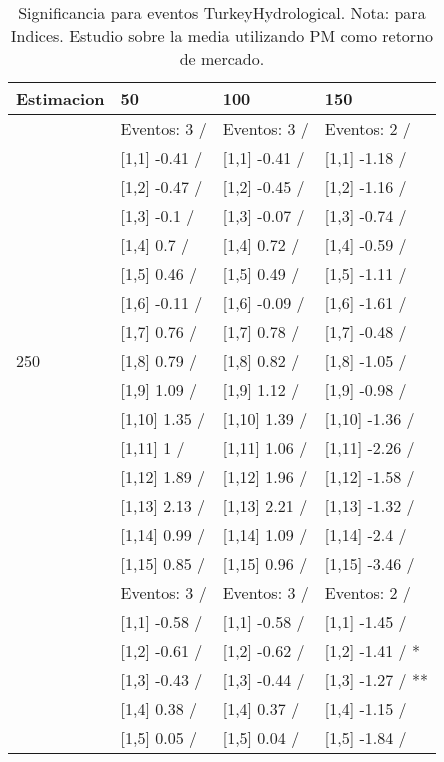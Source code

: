 \begin{table}

\caption{Significancia para eventos TurkeyHydrological. Nota: para Indices. Estudio sobre la media utilizando PM como retorno de mercado.}
\centering
\begin{tabular}[t]{llll}
\toprule
Estimacion & 50 & 100 & 150\\
\midrule
 & Eventos:  3 / & Eventos:  3 / & Eventos:  2 /\\
 & {}[1,1] -0.41  / & {}[1,1] -0.41  / & {}[1,1] -1.18  /\\
 & {}[1,2] -0.47  / & {}[1,2] -0.45  / & {}[1,2] -1.16  /\\
 & {}[1,3] -0.1  / & {}[1,3] -0.07  / & {}[1,3] -0.74  /\\
 & {}[1,4] 0.7  / & {}[1,4] 0.72  / & {}[1,4] -0.59  /\\
\addlinespace
 & {}[1,5] 0.46  / & {}[1,5] 0.49  / & {}[1,5] -1.11  /\\
 & {}[1,6] -0.11  / & {}[1,6] -0.09  / & {}[1,6] -1.61  /\\
 & {}[1,7] 0.76  / & {}[1,7] 0.78  / & {}[1,7] -0.48  /\\
250 & {}[1,8] 0.79  / & {}[1,8] 0.82  / & {}[1,8] -1.05  /\\
 & {}[1,9] 1.09  / & {}[1,9] 1.12  / & {}[1,9] -0.98  /\\
\addlinespace
 & {}[1,10] 1.35  / & {}[1,10] 1.39  / & {}[1,10] -1.36  /\\
 & {}[1,11] 1  / & {}[1,11] 1.06  / & {}[1,11] -2.26  /\\
 & {}[1,12] 1.89  / & {}[1,12] 1.96  / & {}[1,12] -1.58  /\\
 & {}[1,13] 2.13  / & {}[1,13] 2.21  / & {}[1,13] -1.32  /\\
 & {}[1,14] 0.99  / & {}[1,14] 1.09  / & {}[1,14] -2.4  /\\
\addlinespace
 & {}[1,15] 0.85  / & {}[1,15] 0.96  / & {}[1,15] -3.46  /\\
 & Eventos:  3 / & Eventos:  3 / & Eventos:  2 /\\
 & {}[1,1] -0.58  / & {}[1,1] -0.58  / & {}[1,1] -1.45  /\\
 & {}[1,2] -0.61  / & {}[1,2] -0.62  / & {}[1,2] -1.41  / *\\
 & {}[1,3] -0.43  / & {}[1,3] -0.44  / & {}[1,3] -1.27  / **\\
\addlinespace
 & {}[1,4] 0.38  / & {}[1,4] 0.37  / & {}[1,4] -1.15  /\\
 & {}[1,5] 0.05  / & {}[1,5] 0.04  / & {}[1,5] -1.84  /\\

\end{tabular}
\end{table}
